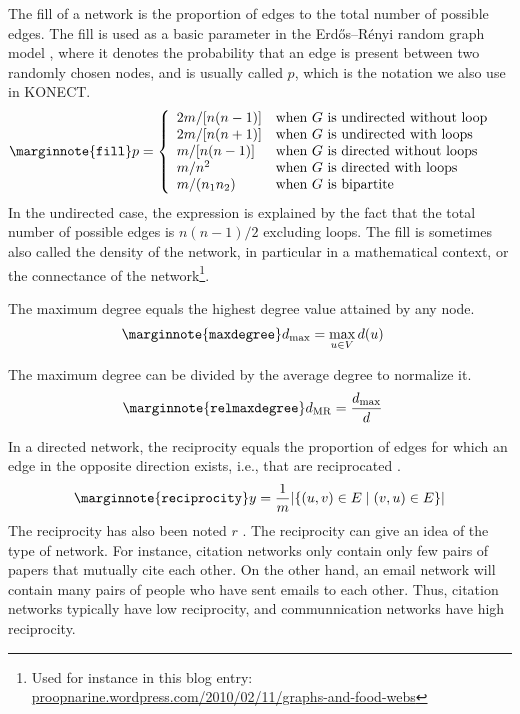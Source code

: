 \documentclass{article}
\begin{document}
The fill of a network is the proportion of edges to the total
number of possible edges. 
The fill is used as a basic parameter in the Erdős--Rényi random graph
model \citep{b569}, where it denotes the probability that an edge is present between
two randomly chosen nodes, and is usually called $p$, which is the
notation we also use in KONECT. 
\begin{align}
  \marginnote{\texttt{fill}}
  p &= \left\{ \begin{array}{ll}
    2m / [n(n-1)] & \text{when $G$ is undirected without loop} \\
    2m / [n(n+1)] & \text{when $G$ is undirected with loops} \\
    m / [n(n-1)] & \text{when $G$ is directed without loops} \\
    m / n^2 & \text{when $G$ is directed with loops} \\
    m / (n_1 n_2) & \text{when $G$ is bipartite} 
  \end{array}\right. 
\end{align}
In the undirected case, the expression is explained by the fact that the
total number of possible edges is $n(n-1)/2$ excluding loops.  
The fill is sometimes also called the density of the network, in
particular in a mathematical context, or the connectance of the
network\footnote{Used for instance in this blog entry:  \href{https://proopnarine.wordpress.com/2010/02/11/graphs-and-food-webs/}{proopnarine.wordpress.com/2010/02/11/graphs-and-food-webs}}. 

The maximum degree equals the highest degree value attained
by any node.
\begin{align}
  \marginnote{\texttt{maxdegree}}
  d_{\max} &= \max_{u\in V} d(u)
\end{align}

The maximum degree can be divided by the average degree to normalize it.
\begin{align}
  \marginnote{\texttt{relmaxdegree}}
  d_{\mathrm{MR}} &= \frac {d_{\max}} {d}
\end{align}

In a directed network, the reciprocity equals the proportion of edges
for which an edge in the opposite direction exists, i.e., that are
reciprocated \citep{b866}.  
\begin{align}
  \marginnote{\texttt{reciprocity}}
  y = \frac 1 m  | \{ (u,v) \in E \mid (v,u) \in E \} | 
\end{align}
The reciprocity has also been noted $r$ \citep{b867}. 
The reciprocity can give an idea of the type of network.  For instance,
citation networks only contain only few pairs of papers that mutually
cite each other.  On the other hand, an email network will contain many
pairs of people who have sent emails to each other.  Thus, citation
networks typically have low reciprocity, and communnication networks
have high reciprocity. 
\end{document}
